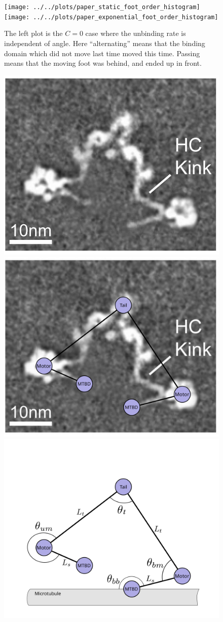 \documentclass[9pt,twocolumn,twoside]{pnas-new}
\begin{document}
\begin{figure}[tbhp]
    \texttt{[image: ../../plots/paper\_static\_foot\_order\_histogram]}
    \texttt{[image: ../../plots/paper\_exponential\_foot\_order\_histogram]}
\caption{The left plot is the $C=0$ case where the unbinding rate is
  independent of angle.  Here ``alternating'' means that the binding
  domain which did not move last time moved this time.  Passing means
  that the moving foot was behind, and ended up in front.}
\label{fig:steppingorder}
\end{figure}

\begin{figure}[tbhp]
  \centering
   \includegraphics[width=0.3\columnwidth]{figures/schematic-1-cryoem}
   \includegraphics[width=0.3\columnwidth]{figures/schematic-1-superimposed}
   \includegraphics[width=0.3\columnwidth]{figures/schematic-1-model}


\end{figure}
\end{document}
